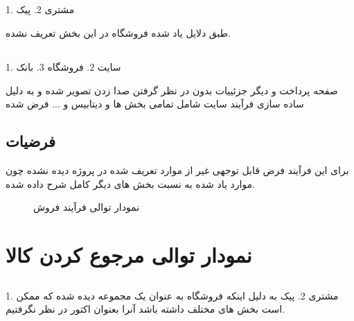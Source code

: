 \documentclass[12pt,onecolumn,a4paper]{article}
\begin{document}
\subsection{ }

1. مشتری
2. پیک

طبق دلایل یاد شده فروشگاه در این بخش تعریف نشده.
\subsection{ }
1. سایت
2. فروشگاه
3. بانک

صفحه پرداخت و دیگر جزئییات بدون در نظر گرفتن صدا زدن  تصویر شده و به دلیل ساده سازی فرآیند سایت شامل تمامی بخش ها و دیتابیس و ... فرض شده

\subsection{فرضیات }
برای این فرآیند فرض قابل توجهی غیر از موارد تعریف شده در پروژه دیده نشده چون موارد یاد شده به نسبت بخش های دیگر کامل شرح داده شده.

\newpage
\begin{figure}[!h]
\caption{نمودار توالی فرآیند فروش}\label{sellpng}
\end{figure}


\section{نمودار توالی مرجوع کردن کالا}
\subsection{ }
1. مشتری
2. پیک
به دلیل اینکه فروشگاه به عنوان یک مجموعه دیده شده که ممکن است بخش های مختلف داشته باشد آنرا بعنوان اکتور در نظر نگرفتیم.
\end{document}
